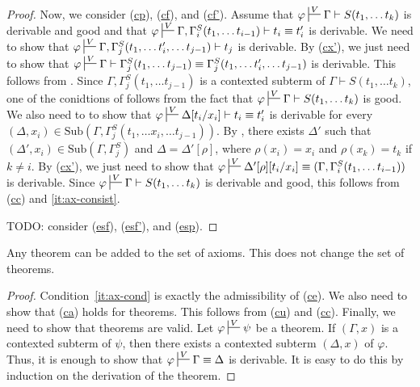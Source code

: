 \documentclass[reqno]{amsart}
\newcommand{\axref}[1]{(\hyperref[ax:#1]{#1})}
\theoremstyle{definition}
\theoremstyle{remark}
\newcommand{\fs}[1]{\mathrm{#1}}
\newcommand{\sub}{\fs{Sub}}
\numberwithin{figure}{section}
\begin{document}
\begin{proof}
Now, we consider \axref{cp}, \axref{cf}, and \axref{cf'}.
Assume that $\varphi \sststile{}{V} \Gamma \vdash S(t_1, \ldots t_k)$ is derivable and good and that $\varphi \sststile{}{V} \Gamma, \Gamma_i^S(t_1, \ldots t_{i-1}) \vdash t_i \equiv t_i'$ is derivable.
We need to show that $\varphi \sststile{}{V} \Gamma, \Gamma_j^S(t_1, \ldots t_i', \ldots t_{j-1}) \vdash t_j$ is derivable.
By \axref{cx'}, we just need to show that $\varphi \sststile{}{V} \Gamma \vdash \Gamma_j^S(t_1, \ldots t_{j-1}) \equiv \Gamma_j^S(t_1, \ldots t_i', \ldots t_{j-1})$ is derivable.
This follows from .
Since $\Gamma, \Gamma_j^S(t_1, \ldots t_{j-1})$ is a contexted subterm of $\Gamma \vdash S(t_1, \ldots t_k)$, one of the conidtions of  follows from the fact that $\varphi \sststile{}{V} \Gamma \vdash S(t_1, \ldots t_k)$ is good.
We also need to to show that $\varphi \sststile{}{V} \Delta[t_i/x_i] \vdash t_i \equiv t_i'$ is derivable for every $(\Delta,x_i) \in \sub(\Gamma, \Gamma_j^S(t_1, \ldots x_i, \ldots t_{j-1}))$.
By , there exists $\Delta'$ such that $(\Delta',x_i) \in \sub(\Gamma,\Gamma_j^S)$ and $\Delta = \Delta'[\rho]$, where $\rho(x_i) = x_i$ and $\rho(x_k) = t_k$ if $k \neq i$.
By \axref{cx'}, we just need to show that $\varphi \sststile{}{V} \Delta'[\rho][t_i/x_i] \equiv (\Gamma, \Gamma_i^S(t_1, \ldots t_{i-1}))$ is derivable.
Since $\varphi \sststile{}{V} \Gamma \vdash S(t_1, \ldots t_k)$ is derivable and good, this follows from \axref{cc} and \eqref{it:ax-consist}.

TODO: consider \axref{esf}, \axref{esf'}, and \axref{esp}.
\end{proof}

\begin{cor}
Any theorem can be added to the set of axioms.
This does not change the set of theorems.
\end{cor}
\begin{proof}
Condition~\eqref{it:ax-cond} is exactly the admissibility of \axref{ce}.
We also need to show that \axref{ca} holds for theorems.
This follows from \axref{cu} and \axref{cc}.
Finally, we need to show that theorems are valid.
Let $\varphi \sststile{}{V} \psi$ be a theorem.
If $(\Gamma,x)$ is a contexted subterm of $\psi$, then there exists a contexted subterm $(\Delta,x)$ of $\varphi$.
Thus, it is enough to show that $\varphi \sststile{}{V} \Gamma \equiv \Delta$ is derivable.
It is easy to do this by induction on the derivation of the theorem.
\end{proof}
\end{document}
